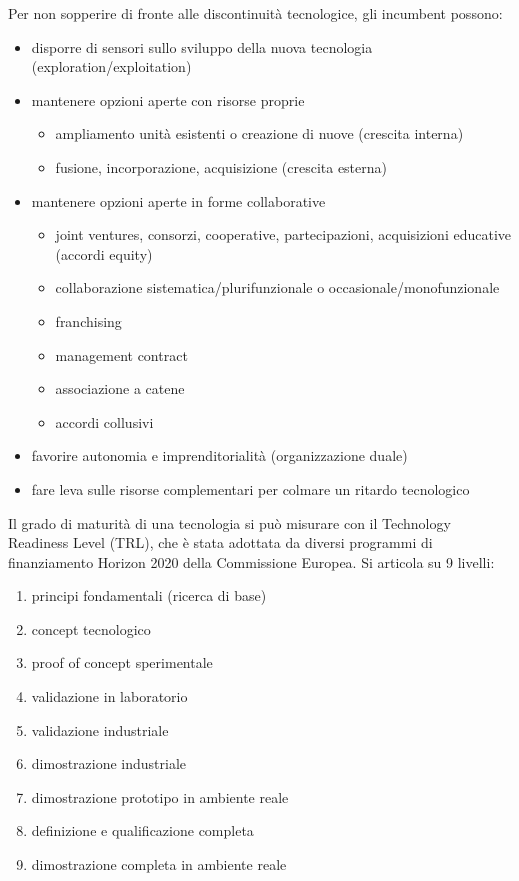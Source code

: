 \documentclass[answers, a4paper, 11pt]{exam}
\begin{document}
Per non sopperire di fronte alle discontinuità tecnologice, gli incumbent possono:
\begin{itemize}
    \item disporre di sensori sullo sviluppo della nuova tecnologia (exploration/exploitation)
    \item mantenere opzioni aperte con risorse proprie
    \begin{itemize}
        \item ampliamento unità esistenti o creazione di nuove (crescita interna)
        \item fusione, incorporazione, acquisizione (crescita esterna)
    \end{itemize}
    \item mantenere opzioni aperte in forme collaborative
    \begin{itemize}
        \item joint ventures, consorzi, cooperative, partecipazioni, acquisizioni educative (accordi equity)
        \item collaborazione sistematica/plurifunzionale o occasionale/monofunzionale
        \item franchising
        \item management contract
        \item associazione a catene
        \item accordi collusivi
    \end{itemize}
    \item favorire autonomia e imprenditorialità (organizzazione duale)
    \item fare leva sulle risorse complementari per colmare un ritardo tecnologico
\end{itemize}

Il grado di maturità di una tecnologia si può misurare con il Technology Readiness Level (TRL), che è stata adottata da diversi programmi di finanziamento Horizon 2020 della Commissione Europea. Si articola su 9 livelli:
\begin{enumerate}
    \item principi fondamentali (ricerca di base)
    \item concept tecnologico
    \item proof of concept sperimentale
    \item validazione in laboratorio
    \item validazione industriale
    \item dimostrazione industriale
    \item dimostrazione prototipo in ambiente reale
    \item definizione e qualificazione completa
    \item dimostrazione completa in ambiente reale
\end{enumerate}
\end{document}
